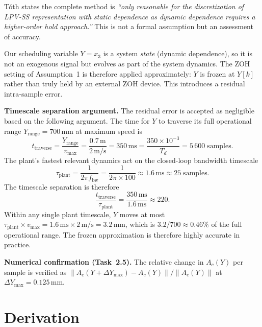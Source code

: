 \documentclass[11pt]{article}
\newcounter{assumption}
\begin{document}
\begin{tcolorbox}[
    colback=orange!4, colframe=orange!60!black, boxrule=0.7pt, arc=1.5mm,
    left=2mm, right=2mm, top=1mm, bottom=1mm,
    title={\bfseries Quasi-LPV caveat}, coltitle=black, colbacktitle=orange!15,
    fonttitle=\bfseries
]
Tóth states the complete method is \emph{``only reasonable for the discretization of
LPV-SS representation with static dependence as dynamic dependence requires a higher-order
hold approach.''} This is not a formal assumption but an assessment of accuracy.

\medskip
Our scheduling variable \(Y = x_3\) is a system \emph{state} (dynamic dependence), so it is
not an exogenous signal but evolves as part of the system dynamics. The ZOH setting of
Assumption~1 is therefore applied approximately: \(Y\) is frozen at \(Y[k]\) rather than
truly held by an external ZOH device. This introduces a residual intra-sample error.

\medskip
\textbf{Timescale separation argument.}
The residual error is accepted as negligible based on the following argument.
The time for \(Y\) to traverse its full operational range \(Y_\text{range} = 700\,\text{mm}\)
at maximum speed is
\[
    t_\text{traverse} = \frac{Y_\text{range}}{v_{\max}}
    = \frac{0.7\,\text{m}}{2\,\text{m/s}}
    = 350\,\text{ms}
    = \frac{350 \times 10^{-3}}{T_d}
    = 5\,600\;\text{samples}.
\]
The plant's fastest relevant dynamics act on the closed-loop bandwidth timescale
\[
    \tau_\text{plant} = \frac{1}{2\pi f_\text{bw}}
    = \frac{1}{2\pi \times 100}
    \approx 1.6\,\text{ms}
    \approx 25\;\text{samples}.
\]
The timescale separation is therefore
\[
    \frac{t_\text{traverse}}{\tau_\text{plant}}
    = \frac{350\,\text{ms}}{1.6\,\text{ms}}
    \approx 220.
\]
Within any single plant timescale, \(Y\) moves at most
\(\tau_\text{plant} \times v_{\max} = 1.6\,\text{ms} \times 2\,\text{m/s} = 3.2\,\text{mm}\),
which is \(3.2/700 \approx 0.46\%\) of the full operational range. The frozen approximation
is therefore highly accurate in practice.

\medskip
\textbf{Numerical confirmation (Task~2.5).}
The relative change in \(A_c(Y)\) per sample is verified as
\(\|A_c(Y + \Delta Y_{\max}) - A_c(Y)\| / \|A_c(Y)\|\) at \(\Delta Y_{\max} = 0.125\,\text{mm}\).
\end{tcolorbox}

\vspace{1.2em}

\section*{Derivation}
\end{document}

